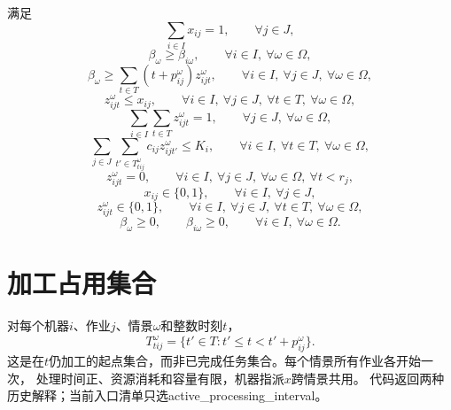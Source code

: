 \documentclass[11pt]{ctexart}
\begin{document}
满足
\begin{equation}
\sum_{i \in I} x_{ij} = 1,
\qquad \forall j \in J,
\tag{M2}
\end{equation}
\begin{equation}
\beta_\omega \ge \beta_{i\omega},
\qquad \forall i \in I,\ \forall \omega \in \Omega,
\tag{M3}
\end{equation}
\begin{equation}
\beta_\omega \ge \sum_{t \in T} (t + p_{ij}^{\omega}) z_{ijt}^{\omega},
\qquad \forall i \in I,\ \forall j \in J,\ \forall \omega \in \Omega,
\tag{M4}
\end{equation}
\begin{equation}
z_{ijt}^{\omega} \le x_{ij},
\qquad \forall i \in I,\ \forall j \in J,\ \forall t \in T,\ \forall \omega \in \Omega,
\tag{M5}
\end{equation}
\begin{equation}
\sum_{i \in I} \sum_{t \in T} z_{ijt}^{\omega} = 1,
\qquad \forall j \in J,\ \forall \omega \in \Omega,
\tag{M6}
\end{equation}
\begin{equation}
\sum_{j \in J} \sum_{t' \in T_{tij}^{\omega}} c_{ij} z_{ijt'}^{\omega} \le K_i,
\qquad \forall i \in I,\ \forall t \in T,\ \forall \omega \in \Omega,
\tag{M7}
\end{equation}
\begin{equation}
z_{ijt}^{\omega} = 0,
\qquad \forall i \in I,\ \forall j \in J,\ \forall \omega \in \Omega,\ \forall t<r_j,
\tag{M8}
\end{equation}
\begin{equation}
x_{ij} \in \{0,1\},
\qquad \forall i \in I,\ \forall j \in J,
\tag{M9}
\end{equation}
\begin{equation}
z_{ijt}^{\omega} \in \{0,1\},
\qquad \forall i \in I,\ \forall j \in J,\ \forall t \in T,\ \forall \omega \in \Omega,
\tag{M10}
\end{equation}
\begin{equation}
\beta_\omega \ge 0,
\qquad
\beta_{i\omega} \ge 0,
\qquad \forall i \in I,\ \forall \omega \in \Omega.
\tag{M11}
\end{equation}


\section*{加工占用集合}
对每个机器$i$、作业$j$、情景$\omega$和整数时刻$t$，
\[
T_{tij}^{\omega}=\{t'\in T:t'\le t<t'+p_{ij}^{\omega}\}.
\]
这是在$t$仍加工的起点集合，而非已完成任务集合。每个情景所有作业各开始一次，
处理时间正、资源消耗和容量有限，机器指派$x$跨情景共用。
代码返回两种历史解释；当前入口清单只选active\_processing\_interval。
\end{document}
